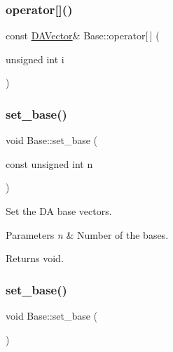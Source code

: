 \subsubsection{\texorpdfstring{operator[]()}{operator[]()}}
{\footnotesize\ttfamily const \mbox{\hyperlink{struct_d_a_vector}{D\+A\+Vector}}\& Base\+::operator\mbox{[}$\,$\mbox{]} (\begin{DoxyParamCaption}\item[{unsigned int}]{i }\end{DoxyParamCaption})\hspace{0.3cm}{\ttfamily [inline]}}

\mbox{\label{struct_base_adea12523c3817b8ee387618307f1d273}} 
\subsubsection{\texorpdfstring{set\_base()}{set\_base()}\hspace{0.1cm}{\footnotesize\ttfamily [1/2]}}
{\footnotesize\ttfamily void Base\+::set\+\_\+base (\begin{DoxyParamCaption}\item[{const unsigned int}]{n }\end{DoxyParamCaption})}



Set the DA base vectors. 


\begin{DoxyParams}{Parameters}
{\em n} & Number of the bases. \\
\hline
\end{DoxyParams}
\begin{DoxyReturn}{Returns}
void. 
\end{DoxyReturn}
\mbox{\label{struct_base_abb310515e957c2c606b068dec5a48ad4}} 
\subsubsection{\texorpdfstring{set\_base()}{set\_base()}\hspace{0.1cm}{\footnotesize\ttfamily [2/2]}}
{\footnotesize\ttfamily void Base\+::set\+\_\+base (\begin{DoxyParamCaption}{ }\end{DoxyParamCaption})}



